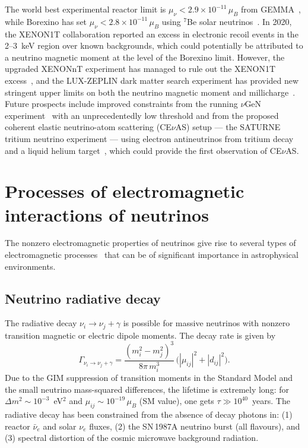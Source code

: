 \documentclass[a4paper,11pt]{article}
\begin{document}
The world best experimental reactor limit is $\mu_\nu < 2.9 \times 10^{-11}\,\mu_B$ from GEMMA~\cite{GEMMA:2012}, while Borexino has set $\mu_\nu < 2.8 \times 10^{-11}\,\mu_B$ using $^7$Be solar neutrinos~\cite{Borexino:2017}. In 2020, the XENON1T collaboration reported an excess in electronic recoil events in the 2--3~keV region over known backgrounds, which could potentially be attributed to a neutrino magnetic moment at the level of the Borexino limit. However, the upgraded XENONnT experiment has managed to rule out the XENON1T excess~\cite{XENONnT:2022}, and the LUX-ZEPLIN dark matter search experiment has provided new stringent upper limits on both the neutrino magnetic moment and millicharge~\cite{Corona:2023PRD}. Future prospects include improved constraints from the running $\nu$GeN experiment~\cite{Alekseev:2022PRD} with an unprecedentedly low threshold and from the proposed coherent elastic neutrino-atom scattering (CE$\nu$AS) setup --- the SATURNE tritium neutrino experiment --- using electron antineutrinos from tritium decay and a liquid helium target~\cite{Cadeddu:2019PRD}, which could provide the first observation of CE$\nu$AS.



\section{Processes of electromagnetic interactions of neutrinos}
\label{sec:processes}

The nonzero electromagnetic properties of neutrinos give rise to several types of electromagnetic processes~\cite{Studenikin:2022JPCS} that can be of significant importance in astrophysical environments.

\subsection{Neutrino radiative decay}

The radiative decay $\nu_i \to \nu_j + \gamma$ is possible for massive neutrinos with nonzero transition magnetic or electric dipole moments. The decay rate is given by~\cite{Giunti:2015RMP}
\begin{equation}
\label{eq:decay_rate}
\Gamma_{\nu_i \to \nu_j + \gamma} = \frac{(m_i^2 - m_j^2)^3}{8\pi\,m_i^3}\,\big(|\mu_{ij}|^2 + |d_{ij}|^2\big).
\end{equation}
Due to the GIM suppression of transition moments in the Standard Model and the small neutrino mass-squared differences, the lifetime is extremely long: for $\Delta m^2 \sim 10^{-3}$~eV$^2$ and $\mu_{ij} \sim 10^{-19}\,\mu_B$ (SM value), one gets $\tau \gg 10^{40}$~years. The radiative decay has been constrained from the absence of decay photons in: (1) reactor $\bar{\nu}_e$ and solar $\nu_e$ fluxes, (2) the SN\,1987A neutrino burst (all flavours), and (3) spectral distortion of the cosmic microwave background radiation.
\end{document}
